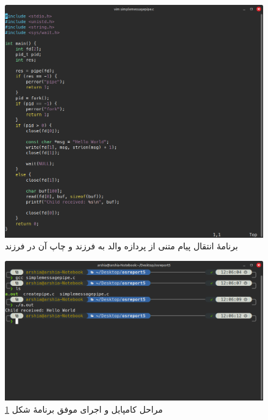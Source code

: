 \documentclass[12pt]{article}
\begin{document}
	\begin{figure}[H]
		\centering
		\includegraphics[width=\textwidth]{report5-resources/4.png}
		\caption{برنامهٔ انتقال پیام متنی از پردازه والد به فرزند و چاپ آن در فرزند}
		\label{img:4}
	\end{figure}
	\begin{figure}[H]
		\centering
		\includegraphics[width=\textwidth]{report5-resources/5.png}
		\caption{مراحل کامپایل و اجرای موفق برنامهٔ شکل \ref{img:4}}
		\label{img:5}
	\end{figure}
\end{document}

